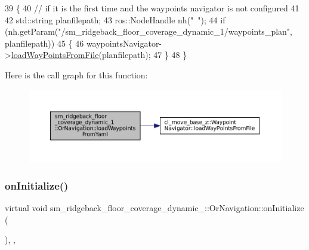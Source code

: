 \begin{DoxyCode}
39     \{
40         \textcolor{comment}{// if it is the first time and the waypoints navigator is not configured}
41 
42         std::string planfilepath;
43         ros::NodeHandle nh(\textcolor{stringliteral}{"~"});
44         \textcolor{keywordflow}{if} (nh.getParam(\textcolor{stringliteral}{"/sm\_ridgeback\_floor\_coverage\_dynamic\_1/waypoints\_plan"}, planfilepath))
45         \{
46             waypointsNavigator->\hyperlink{classcl__move__base__z_1_1WaypointNavigator_a18d74467ddf0e637a8d5a6e1fa2e93db}{loadWayPointsFromFile}(planfilepath);
47         \}
48     \}
\end{DoxyCode}
Here is the call graph for this function\+:
\nopagebreak
\begin{figure}[H]
\begin{center}
\leavevmode
\includegraphics[width=350pt]{classsm__ridgeback__floor__coverage__dynamic__1_1_1OrNavigation_a4aa48f8ae2e850900e06ea10b472d6cf_cgraph}
\end{center}
\end{figure}
\mbox{\label{classsm__ridgeback__floor__coverage__dynamic__1_1_1OrNavigation_a4d090d426655e16dc668f48699d0f9c9}} 
\subsubsection{\texorpdfstring{on\+Initialize()}{onInitialize()}}
{\footnotesize\ttfamily virtual void sm\+\_\+ridgeback\+\_\+floor\+\_\+coverage\+\_\+dynamic\+\_\+::\+Or\+Navigation\+::on\+Initialize (\begin{DoxyParamCaption}{ }\end{DoxyParamCaption})\hspace{0.3cm}{\ttfamily [inline]}, {\ttfamily [override]}, {\ttfamily [virtual]}}



